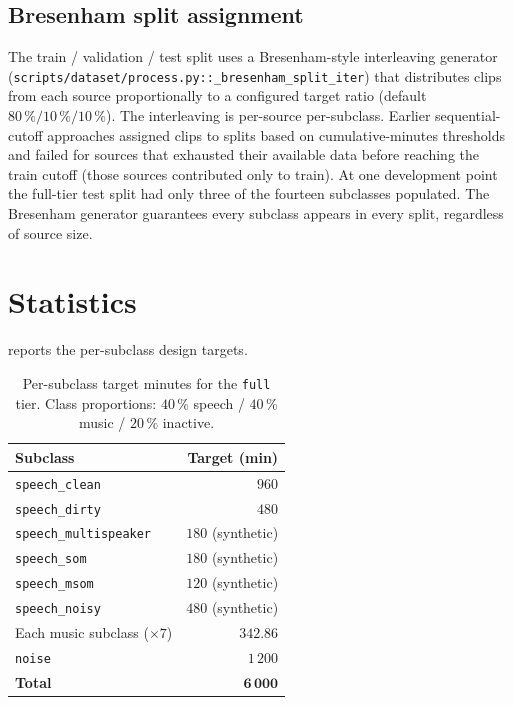 \subsection*{Bresenham split assignment}

The train / validation / test split uses a Bresenham-style interleaving generator (\texttt{scripts/dataset/process.py::\_bresenham\_split\_iter}) that distributes clips from each source proportionally to a configured target ratio (default $80\,\%/10\,\%/10\,\%$).
The interleaving is per-source per-subclass.
Earlier sequential-cutoff approaches assigned clips to splits based on cumulative-minutes thresholds and failed for sources that exhausted their available data before reaching the train cutoff (those sources contributed only to train).
At one development point the full-tier test split had only three of the fourteen subclasses populated.
The Bresenham generator guarantees every subclass appears in every split, regardless of source size.

\section{Statistics}
\label{sec:dataset_statistics}

 reports the per-subclass design targets.

\begin{table}[h]
\centering
\begin{tabular}{lr}
\toprule
\textbf{Subclass} & \textbf{Target (min)} \\
\midrule
\texttt{speech\_clean}        & $960$ \\
\texttt{speech\_dirty}        & $480$ \\
\texttt{speech\_multispeaker} & $180$ (synthetic) \\
\texttt{speech\_som}          & $180$ (synthetic) \\
\texttt{speech\_msom}         & $120$ (synthetic) \\
\texttt{speech\_noisy}        & $480$ (synthetic) \\
\midrule
Each music subclass ($\times 7$) & $342.86$ \\
\midrule
\texttt{noise}                & $1\,200$ \\
\midrule
\textbf{Total}                & $\mathbf{6\,000}$ \\
\bottomrule
\end{tabular}
\caption{Per-subclass target minutes for the \texttt{full} tier. Class proportions: $40\,\%$ speech / $40\,\%$ music / $20\,\%$ inactive.}
\label{tab:dataset_full_tier_targets}
\end{table}

